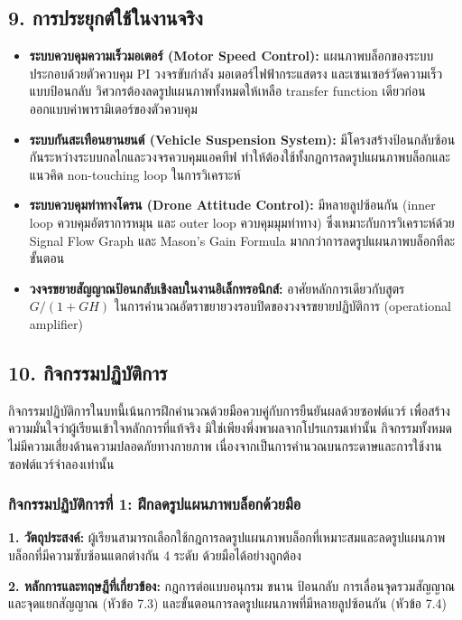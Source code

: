 \subsection{9. การประยุกต์ใช้ในงานจริง}

\begin{itemize}
    \item \textbf{ระบบควบคุมความเร็วมอเตอร์ (Motor Speed Control):} แผนภาพบล็อกของระบบประกอบด้วยตัวควบคุม PI วงจรขับกำลัง มอเตอร์ไฟฟ้ากระแสตรง และเซนเซอร์วัดความเร็วแบบป้อนกลับ วิศวกรต้องลดรูปแผนภาพทั้งหมดให้เหลือ transfer function เดียวก่อนออกแบบค่าพารามิเตอร์ของตัวควบคุม
    \item \textbf{ระบบกันสะเทือนยานยนต์ (Vehicle Suspension System):} มีโครงสร้างป้อนกลับซ้อนกันระหว่างระบบกลไกและวงจรควบคุมแอคทีฟ ทำให้ต้องใช้ทั้งกฎการลดรูปแผนภาพบล็อกและแนวคิด non-touching loop ในการวิเคราะห์
    \item \textbf{ระบบควบคุมท่าทางโดรน (Drone Attitude Control):} มีหลายลูปซ้อนกัน (inner loop ควบคุมอัตราการหมุน และ outer loop ควบคุมมุมท่าทาง) ซึ่งเหมาะกับการวิเคราะห์ด้วย Signal Flow Graph และ Mason's Gain Formula มากกว่าการลดรูปแผนภาพบล็อกทีละขั้นตอน
    \item \textbf{วงจรขยายสัญญาณป้อนกลับเชิงลบในงานอิเล็กทรอนิกส์:} อาศัยหลักการเดียวกับสูตร $G/(1+GH)$ ในการคำนวณอัตราขยายวงรอบปิดของวงจรขยายปฏิบัติการ (operational amplifier)
\end{itemize}

\newpage

\subsection{10. กิจกรรมปฏิบัติการ}

กิจกรรมปฏิบัติการในบทนี้เน้นการฝึกคำนวณด้วยมือควบคู่กับการยืนยันผลด้วยซอฟต์แวร์ เพื่อสร้างความมั่นใจว่าผู้เรียนเข้าใจหลักการที่แท้จริง มิใช่เพียงพึ่งพาผลจากโปรแกรมเท่านั้น กิจกรรมทั้งหมดไม่มีความเสี่ยงด้านความปลอดภัยทางกายภาพ เนื่องจากเป็นการคำนวณบนกระดาษและการใช้งานซอฟต์แวร์จำลองเท่านั้น

\subsubsection{กิจกรรมปฏิบัติการที่ 1: ฝึกลดรูปแผนภาพบล็อกด้วยมือ}

\textbf{1. วัตถุประสงค์:} ผู้เรียนสามารถเลือกใช้กฎการลดรูปแผนภาพบล็อกที่เหมาะสมและลดรูปแผนภาพบล็อกที่มีความซับซ้อนแตกต่างกัน 4 ระดับ ด้วยมือได้อย่างถูกต้อง

\textbf{2. หลักการและทฤษฎีที่เกี่ยวข้อง:} กฎการต่อแบบอนุกรม ขนาน ป้อนกลับ การเลื่อนจุดรวมสัญญาณและจุดแยกสัญญาณ (หัวข้อ 7.3) และขั้นตอนการลดรูปแผนภาพที่มีหลายลูปซ้อนกัน (หัวข้อ 7.4)

